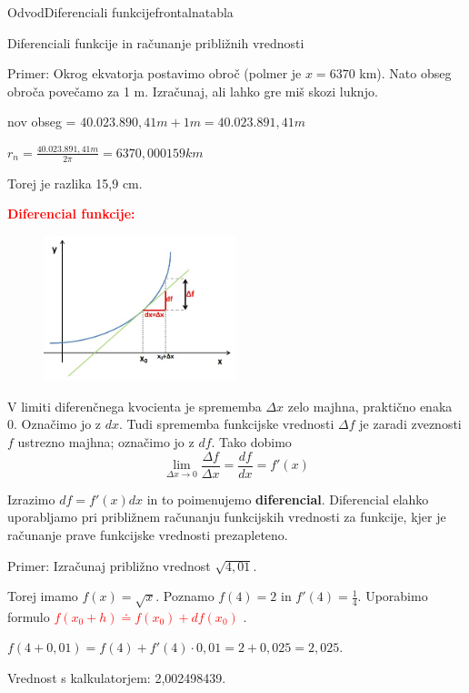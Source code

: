 \begin{priprava}{}{}{Odvod}{Diferenciali funkcije}{frontalna}{tabla}

Diferenciali funkcije in računanje približnih vrednosti

Primer: Okrog ekvatorja postavimo obroč (polmer je $ x = 6370 $ km). Nato obseg obroča povečamo za 1 m. Izračunaj, ali lahko gre miš skozi luknjo.

nov obseg = $ 40.023.890{,}41 m + 1 m = 40.023.891{,}41 m $

$ r_n = \frac{40.023.891{,}41 m}{2 \pi} = 6370{,}000159 km $

Torej je razlika 15{,}9 cm.


\textcolor{red}{\textbf{Diferencial funkcije:}}

\begin{figure}[h]
    \centering
    \includegraphics[width=0.5\textwidth]{slike/diferencial.jpg}
\end{figure}

V limiti diferenčnega kvocienta je sprememba $ \Delta x $ zelo majhna, praktično enaka 0. Označimo jo z $ dx $. Tudi sprememba funkcijske vrednosti $ \Delta f $ je zaradi zveznosti $ f $ ustrezno majhna; označimo jo z $ df $. Tako dobimo
$$ \lim_{\Delta x \to 0} \frac{\Delta f}{\Delta x} = \frac{df}{dx} = f'(x) $$

Izrazimo $ df = f'(x) dx $ in to poimenujemo \textbf{diferencial}. Diferencial elahko uporabljamo pri približnem računanju funkcijskih vrednosti za funkcije, kjer je računanje prave funkcijske vrednosti prezapleteno.

Primer: Izračunaj približno vrednost $ \sqrt{4{,}01} $.

Torej imamo $ f(x) = \sqrt{x} $. Poznamo $ f(4) = 2 $ in $ f'(4) = \frac{1}{4} $. Uporabimo formulo \textcolor{red}{$ f(x_0 + h) \doteq f(x_0) + df(x_0) $} .

$ f(4 + 0{,}01) = f(4) + f'(4) \cdot 0{,}01 = 2 + 0{,}025 = 2{,}025 $.

Vrednost s kalkulatorjem: 2{,}002498439.

    
\end{priprava}